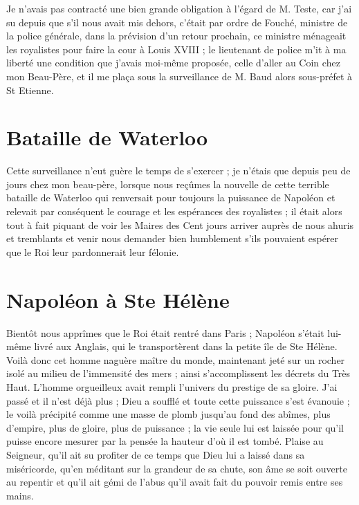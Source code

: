 \documentclass[11pt,a4paper]{report}
\begin{document}
Je n'avais pas contracté une bien grande obligation à l'égard de M. Teste, car j'ai su depuis que s'il nous avait mis dehors, c'était par ordre de Fouché, ministre de la police générale, dans la prévision d'un retour prochain, ce ministre ménageait les royalistes pour faire la cour à Louis XVIII ; le lieutenant de police m'it à ma liberté une condition que j'avais moi-même proposée, celle d'aller au Coin chez mon Beau-Père, et il me plaça sous la surveillance de M. Baud alors sous-préfet à St Etienne.

\section*{Bataille de Waterloo}

Cette surveillance n'eut guère le temps de s'exercer ; je n'étais que depuis peu de jours chez mon beau-père, lorsque nous reçûmes la nouvelle de cette terrible bataille de Waterloo qui renversait pour toujours la puissance de Napoléon et relevait par conséquent le courage et les espérances des royalistes ; il était alors tout à fait piquant de voir les Maires des Cent jours arriver auprès de nous ahuris et tremblants et venir nous demander bien humblement s'ils pouvaient espérer que le Roi leur pardonnerait leur félonie.

\section*{Napoléon à Ste Hélène}

Bientôt nous apprîmes que le Roi était rentré dans Paris ; Napoléon s'était lui-même livré aux Anglais, qui le transportèrent dans la petite île de Ste Hélène. Voilà donc cet homme naguère maître du monde, maintenant jeté sur un rocher isolé au milieu de l'immensité des mers ; ainsi s'accomplissent les décrets du Très Haut. L'homme orgueilleux avait rempli l'univers du prestige de sa gloire. J'ai passé et il n'est déjà plus ; Dieu a soufflé et toute cette puissance s'est évanouie ; le voilà précipité comme une masse de plomb jusqu'au fond des abîmes, plus d'empire, plus de gloire, plus de puissance ; la vie seule lui est laissée pour qu'il puisse encore mesurer par la pensée la hauteur d'où il est tombé. Plaise au Seigneur, qu'il ait su profiter de ce temps que Dieu lui a laissé dans sa miséricorde, qu'en méditant sur la grandeur de sa chute, son âme se soit ouverte au repentir et qu'il ait gémi de l'abus qu'il avait fait du pouvoir remis entre ses mains.
\end{document}
